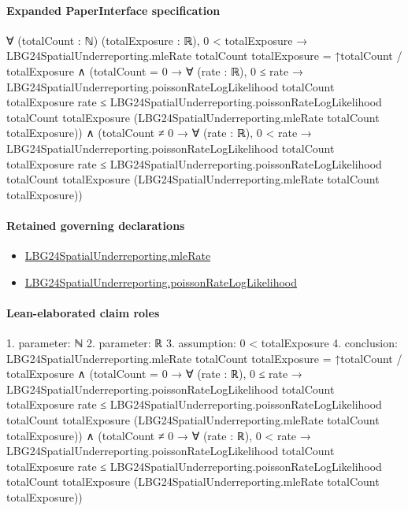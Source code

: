 \documentclass[10pt]{article}
\begin{document}
\paragraph{Expanded PaperInterface specification}
\begin{ReviewVerbatim}
∀ (totalCount : ℕ) (totalExposure : ℝ),
  0 < totalExposure →
    LBG24SpatialUnderreporting.mleRate totalCount totalExposure = ↑totalCount / totalExposure ∧
      (totalCount = 0 →
          ∀ (rate : ℝ),
            0 ≤ rate →
              LBG24SpatialUnderreporting.poissonRateLogLikelihood totalCount totalExposure rate ≤
                LBG24SpatialUnderreporting.poissonRateLogLikelihood totalCount totalExposure
                  (LBG24SpatialUnderreporting.mleRate totalCount totalExposure)) ∧
        (totalCount ≠ 0 →
          ∀ (rate : ℝ),
            0 < rate →
              LBG24SpatialUnderreporting.poissonRateLogLikelihood totalCount totalExposure rate ≤
                LBG24SpatialUnderreporting.poissonRateLogLikelihood totalCount totalExposure
                  (LBG24SpatialUnderreporting.mleRate totalCount totalExposure))
\end{ReviewVerbatim}

\paragraph{Retained governing declarations}
\begin{itemize}\raggedright
\item \hyperlink{governing-declaration-e6552f42a9fa7521}{LBG24\allowbreak{}Spatial\allowbreak{}Underreporting.\allowbreak{}mle\allowbreak{}Rate}
\item \hyperlink{governing-declaration-62494f5e0d094bbb}{LBG24\allowbreak{}Spatial\allowbreak{}Underreporting.\allowbreak{}poisson\allowbreak{}Rate\allowbreak{}Log\allowbreak{}Likelihood}
\end{itemize}
\paragraph{Lean-elaborated claim roles}\begin{ReviewVerbatim}
1. parameter: ℕ
2. parameter: ℝ
3. assumption: 0 < totalExposure
4. conclusion: LBG24SpatialUnderreporting.mleRate totalCount totalExposure = ↑totalCount / totalExposure ∧
  (totalCount = 0 →
      ∀ (rate : ℝ),
        0 ≤ rate →
          LBG24SpatialUnderreporting.poissonRateLogLikelihood totalCount totalExposure rate ≤
            LBG24SpatialUnderreporting.poissonRateLogLikelihood totalCount totalExposure
              (LBG24SpatialUnderreporting.mleRate totalCount totalExposure)) ∧
    (totalCount ≠ 0 →
      ∀ (rate : ℝ),
        0 < rate →
          LBG24SpatialUnderreporting.poissonRateLogLikelihood totalCount totalExposure rate ≤
            LBG24SpatialUnderreporting.poissonRateLogLikelihood totalCount totalExposure
              (LBG24SpatialUnderreporting.mleRate totalCount totalExposure))
\end{ReviewVerbatim}
\end{document}
